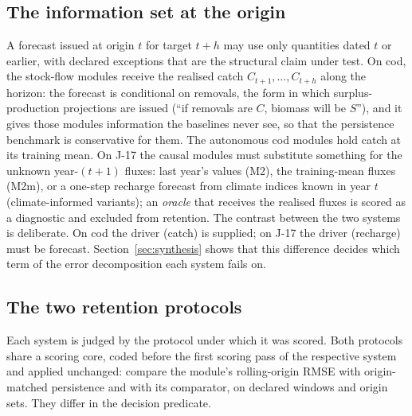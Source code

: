 \documentclass[preprint,11pt,authoryear]{elsarticle}
\theoremstyle{definition}
\theoremstyle{remark}
\begin{document}
\subsection{The information set at the origin}\label{sec:info}

A forecast issued at origin $t$ for target $t+h$ may use only quantities dated $t$ or earlier, with declared exceptions that are the structural claim under test. On cod, the stock-flow modules receive the realised catch $C_{t+1},\dots,C_{t+h}$ along the horizon: the forecast is conditional on removals, the form in which surplus-production projections are issued (``if removals are $C$, biomass will be $S$''), and it gives those modules information the baselines never see, so that the persistence benchmark is conservative for them. The autonomous cod modules hold catch at its training mean. On J-17 the causal modules must substitute something for the unknown year-$(t+1)$ fluxes: last year's values (M2), the training-mean fluxes (M2m), or a one-step recharge forecast from climate indices known in year $t$ (climate-informed variants); an \emph{oracle} that receives the realised fluxes is scored as a diagnostic and excluded from retention. The contrast between the two systems is deliberate. On cod the driver (catch) is supplied; on J-17 the driver (recharge) must be forecast. Section~\ref{sec:synthesis} shows that this difference decides which term of the error decomposition each system fails on.

\subsection{The two retention protocols}\label{sec:protocols}

Each system is judged by the protocol under which it was scored. Both protocols share a scoring core, coded before the first scoring pass of the respective system and applied unchanged: compare the module's rolling-origin RMSE with origin-matched persistence and with its comparator, on declared windows and origin sets. They differ in the decision predicate.
\end{document}
